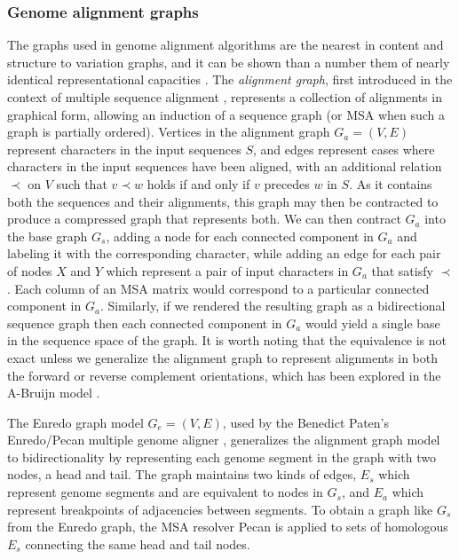 \subsubsection{Genome alignment graphs}
\label{sec:genome_alignment_graphs}
The graphs used in genome alignment algorithms are the nearest in content and structure to variation graphs, and it can be shown than a number them of nearly identical representational capacities \cite{kehr2014genome}.
The \emph{alignment graph}, first introduced in the context of multiple sequence alignment \cite{kececioglu1993maximum,rausch2008segment}, represents a collection of alignments in graphical form, allowing an induction of a sequence graph (or MSA when such a graph is partially ordered).
Vertices in the alignment graph $G_a = (V, E)$ represent characters in the input sequences $S$, and edges represent cases where characters in the input sequences have been aligned, with an additional relation $\prec$ on $V$ such that $v \prec w$ holds if and only if $v$ precedes $w$ in $S$.
As it contains both the sequences and their alignments, this graph may then be contracted to produce a compressed graph that represents both.
We can then contract $G_a$ into the base graph $G_s$, adding a node for each connected component in $G_a$ and labeling it with the corresponding character, while adding an edge for each pair of nodes $X$ and $Y$ which represent a pair of input characters in $G_a$ that satisfy $\prec$.
Each column of an MSA matrix would correspond to a particular connected component in $G_a$.
Similarly, if we rendered the resulting graph as a bidirectional sequence graph then each connected component in $G_a$ would yield a single base in the sequence space of the graph.
It is worth noting that the equivalence is not exact unless we generalize the alignment graph to represent alignments in both the forward or reverse complement orientations, which has been explored in the A-Bruijn model \cite{raphael2004novel}.

The Enredo graph model $G_e = (V, E)$, used by the Benedict Paten's Enredo/Pecan multiple genome aligner \cite{paten2008enredo}, generalizes the alignment graph model to bidirectionality by representing each genome segment in the graph with two nodes, a head and tail.
The graph maintains two kinds of edges, $E_s$ which represent genome segments and are equivalent to nodes in $G_s$, and $E_a$ which represent breakpoints of adjacencies between segments.
To obtain a graph like $G_s$ from the Enredo graph, the MSA resolver Pecan is applied to sets of homologous $E_s$ connecting the same head and tail nodes.

